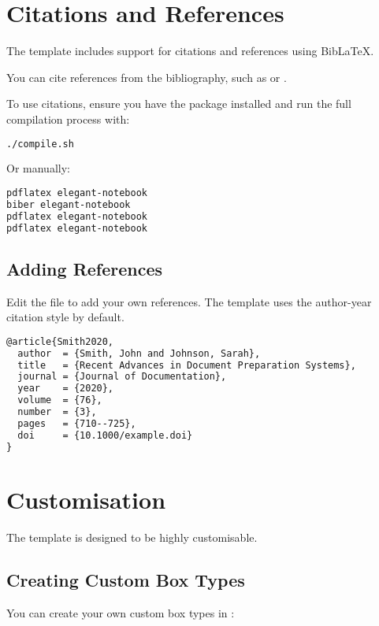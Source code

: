 \documentclass[a4paper,11pt]{article}
\begin{document}
\section{Citations and References}
The template includes support for citations and references using BibLaTeX.

You can cite references from the bibliography, such as \cite{Smith2020} or \cite{Lamport1994}.

\begin{notetbox}
    To use citations, ensure you have the  package installed and run the full compilation process with:
    \begin{lstlisting}[language=bash]
./compile.sh
    \end{lstlisting}
    Or manually:
    \begin{lstlisting}[language=bash]
pdflatex elegant-notebook
biber elegant-notebook
pdflatex elegant-notebook
pdflatex elegant-notebook
    \end{lstlisting}
\end{notetbox}

\subsection{Adding References}
Edit the  file to add your own references. The template uses the author-year citation style by default.

\begin{lstlisting}[language=TeX, caption={Example reference entry}, label={lst:reference}]
@article{Smith2020,
  author  = {Smith, John and Johnson, Sarah},
  title   = {Recent Advances in Document Preparation Systems},
  journal = {Journal of Documentation},
  year    = {2020},
  volume  = {76},
  number  = {3},
  pages   = {710--725},
  doi     = {10.1000/example.doi}
}
\end{lstlisting}

\section{Customisation}
The template is designed to be highly customisable.

\subsection{Creating Custom Box Types}
You can create your own custom box types in :
\end{document}
